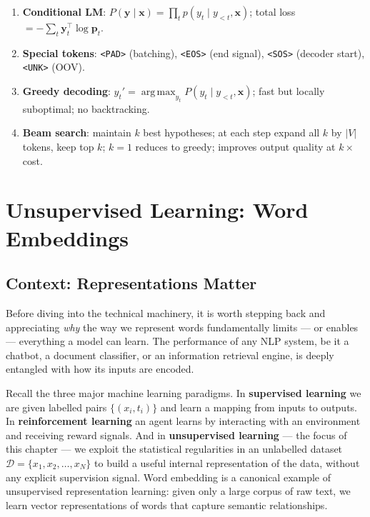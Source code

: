 \documentclass[11pt,a4paper]{article}
\begin{document}
\begin{tcolorbox}[colback=WarningRedBg,colframe=WarningRed,boxrule=0.8pt,arc=3pt]
\begin{enumerate}
  \item \textbf{Conditional LM}: $P(\mathbf{y}\mid\mathbf{x}) = \prod_t p(y_t\mid y_{<t},\mathbf{x})$; total loss $= -\sum_t \mathbf{y}_t^\top \log \mathbf{p}_t$.
  \item \textbf{Special tokens}: \texttt{<PAD>} (batching), \texttt{<EOS>} (end signal), \texttt{<SOS>} (decoder start), \texttt{<UNK>} (OOV).
  \item \textbf{Greedy decoding}: $y_t' = \operatorname*{arg\,max}_{y_t} P(y_t\mid y_{<t},\mathbf{x})$; fast but locally suboptimal; no backtracking.
  \item \textbf{Beam search}: maintain $k$ best hypotheses; at each step expand all $k$ by $|V|$ tokens, keep top $k$; $k=1$ reduces to greedy; improves output quality at $k\times$ cost.
\end{enumerate}
\end{tcolorbox}

\newpage
\section{Unsupervised Learning: Word Embeddings}
\label{sec:word_embedding}

\subsection{Context: Representations Matter}
\label{sec:we_context}

Before diving into the technical machinery, it is worth stepping back and appreciating \emph{why} the way we represent words fundamentally limits — or enables — everything a model can learn. The performance of any NLP system, be it a chatbot, a document classifier, or an information retrieval engine, is deeply entangled with how its inputs are encoded.

Recall the three major machine learning paradigms. In \textbf{supervised learning} we are given labelled pairs $\{(x_i, t_i)\}$ and learn a mapping from inputs to outputs. In \textbf{reinforcement learning} an agent learns by interacting with an environment and receiving reward signals. And in \textbf{unsupervised learning} — the focus of this chapter — we exploit the statistical regularities in an unlabelled dataset $\mathcal{D} = \{x_1, x_2, \ldots, x_N\}$ to build a useful internal representation of the data, without any explicit supervision signal. Word embedding is a canonical example of unsupervised representation learning: given only a large corpus of raw text, we learn vector representations of words that capture semantic relationships.
\end{document}
